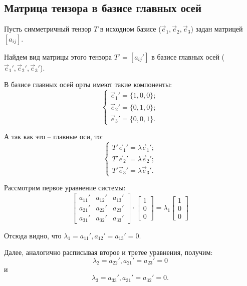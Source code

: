 \subsection{Матрица тензора в базисе главных осей}

	Пусть симметричный тензор \( T \) в исходном базисе (\( \vec{e}_1, \vec{e}_2, \vec{e}_3 \)) задан матрицей \( [a_{ij}] \).
	
	Найдем вид матрицы этого тензора \( T' = [a_{ij}{'}] \) в базисе главных осей (\( \vec{e}_1{'}, \vec{e}_2{'}, \vec{e}_3{'} \)).
	
	В базисе главных осей орты имеют такие компоненты:
	\[ \left\{ \begin{array}{l}
		\vec{e}_1{'} = \{ 1, 0, 0 \}; \\
		\vec{e}_2{'} = \{ 0, 1, 0 \}; \\
		\vec{e}_3{'} = \{ 0, 0, 1 \}.
	\end{array} \right. \]
	
	А так как это -- главные оси, то:
	\begin{equation} \left\{	\begin{array}{l}
		T'\vec{e}_1{'} = \lambda\vec{e}_1{'}; \\
		T'\vec{e}_2{'} = \lambda\vec{e}_2{'}; \\
		T'\vec{e}_3{'} = \lambda\vec{e}_3{'}.
	\end{array} \right. \label{eq9:910n1} \end{equation}
	
	Рассмотрим первое уравнение системы:
	\[ \begin{bmatrix}
		a_{11}{'} & a_{12}{'} & a_{13}{'} \\
		a_{21}{'} & a_{22}{'} & a_{23}{'} \\
		a_{31}{'} & a_{32}{'} & a_{33}{'}
	\end{bmatrix}\cdot\begin{bmatrix}
		1 \\ 0 \\ 0
	\end{bmatrix} = \lambda_1 \begin{bmatrix}
		1 \\ 0 \\ 0
	\end{bmatrix} \]
	
	Отсюда видно, что \( \lambda_1 = a_{11}{'}, a_{12}{'} = a_{13}{'} = 0 \).
	
	Далее, аналогично расписывая второе и третее уравнения, получим:
	\[ \lambda_2 = a_{22}{'}, a_{21}{'} = a_{23}{'} = 0 \]
	и
	\[ \lambda_3 = a_{33}{'}, a_{31}{'} = a_{32}{'} = 0. \]
	
